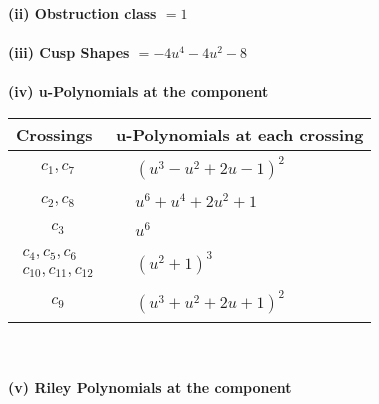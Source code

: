 \documentclass[1p]{elsarticle_modified}
\theoremstyle{definition}
\begin{document}
\flushleft \textbf{(ii) Obstruction class $= 1$}\\~\\
\flushleft \textbf{(iii) Cusp Shapes $= -4 u^4-4 u^2-8$}\\~\\
\newpage\renewcommand{\arraystretch}{1}
\flushleft \textbf{(iv) u-Polynomials at the component}\newline \\
\begin{tabular}{m{50pt}|m{274pt}}
Crossings & \hspace{64pt}u-Polynomials at each crossing \\
\hline $$\begin{aligned}c_{1},c_{7}\end{aligned}$$&$\begin{aligned}
&(u^3- u^2+2 u-1)^2
\end{aligned}$\\
\hline $$\begin{aligned}c_{2},c_{8}\end{aligned}$$&$\begin{aligned}
&u^6+u^4+2 u^2+1
\end{aligned}$\\
\hline $$\begin{aligned}c_{3}\end{aligned}$$&$\begin{aligned}
&u^6
\end{aligned}$\\
\hline $$\begin{aligned}c_{4},c_{5},c_{6}\\c_{10},c_{11},c_{12}\end{aligned}$$&$\begin{aligned}
&(u^2+1)^3
\end{aligned}$\\
\hline $$\begin{aligned}c_{9}\end{aligned}$$&$\begin{aligned}
&(u^3+u^2+2 u+1)^2
\end{aligned}$\\
\hline
\end{tabular}\\~\\
\newpage\renewcommand{\arraystretch}{1}
\flushleft \textbf{(v) Riley Polynomials at the component}\newline \\
\end{document}
